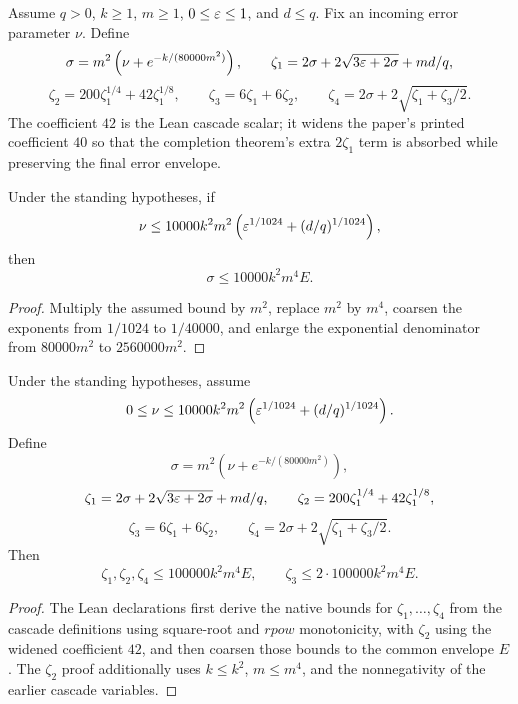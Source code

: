 \begin{definition}\label{def:main-formal-error-cascade}
	\leanok
	Assume $q > 0$, $k \ge 1$, $m \ge 1$, $0 \le \varepsilon \le 1$, and $d \le q$. Fix an incoming error parameter $\nu$. Define
	\[
		\sigma = m^2\left(\nu + e^{-k/(80000m^2)}\right),
		\qquad
		\zeta_1 = 2\sigma + 2\sqrt{3\varepsilon+2\sigma} + md/q,
	\]
	\[
		\zeta_2 = 200\zeta_1^{1/4} + 42\zeta_1^{1/8},
		\qquad
		\zeta_3 = 6\zeta_1 + 6\zeta_2,
		\qquad
		\zeta_4 = 2\sigma + 2\sqrt{\zeta_1+\zeta_3/2}.
	\]
	The coefficient $42$ is the Lean cascade scalar; it widens the paper's printed
	coefficient $40$ so that the completion theorem's extra $2\zeta_1$ term is
	absorbed while preserving the final error envelope.
\end{definition}

\begin{theorem}\label{thm:sigma-bound-main-formal}
	\leanok
	Under the standing hypotheses, if
	\[
		\nu \le 10000k^2m^2\left(\varepsilon^{1/1024} + (d/q)^{1/1024}\right),
	\]
	then
	\[
		\sigma \le 10000k^2m^4 E.
	\]
\end{theorem}
\begin{proof}
	\leanok
	Multiply the assumed bound by $m^2$, replace $m^2$ by $m^4$, coarsen the exponents from $1/1024$ to $1/40000$, and enlarge the exponential denominator from $80000m^2$ to $2560000m^2$.
\end{proof}

\begin{theorem}\label{thm:zeta-bounds-main-formal}
	\leanok
	Under the standing hypotheses, assume
	\[
		0 \le \nu \le 10000k^2m^2\left(\varepsilon^{1/1024} + (d/q)^{1/1024}\right).
	\]
	Define
	\[
		\sigma = m^2\left(\nu + e^{-k/(80000m^2)}\right),
	\]
	\[
		\zeta_1 = 2\sigma + 2\sqrt{3\varepsilon + 2\sigma} + md/q,
		\qquad
		\zeta_2 = 200\zeta_1^{1/4} + 42\zeta_1^{1/8},
	\]
	\[
		\zeta_3 = 6\zeta_1 + 6\zeta_2,
		\qquad
		\zeta_4 = 2\sigma + 2\sqrt{\zeta_1 + \zeta_3/2}.
	\]
	Then
	\[
		\zeta_1, \zeta_2, \zeta_4 \le 100000k^2m^4 E,
		\qquad
		\zeta_3 \le 2 \cdot 100000k^2m^4 E.
	\]
\end{theorem}
\begin{proof}
	\leanok
	The Lean declarations first derive the native bounds for $\zeta_1,\dots,\zeta_4$
	from the cascade definitions using square-root and $rpow$ monotonicity, with
	$\zeta_2$ using the widened coefficient $42$, and then coarsen those bounds to
	the common envelope $E$. The $\zeta_2$ proof additionally uses $k \le k^2$,
	$m \le m^4$, and the nonnegativity of the earlier cascade variables.
\end{proof}


